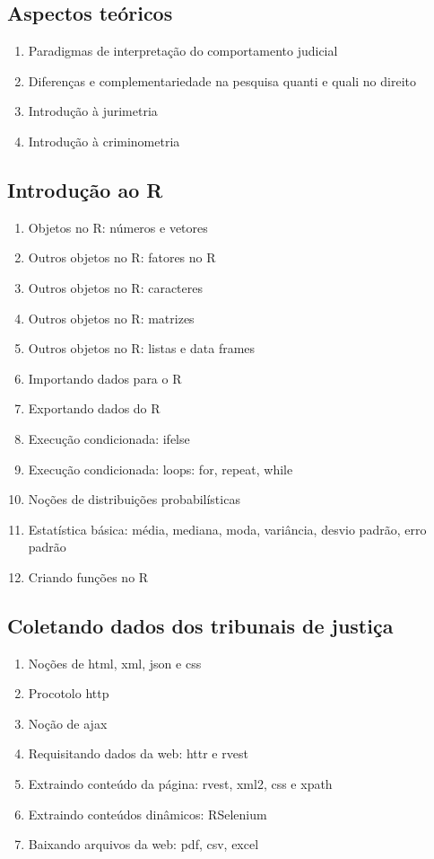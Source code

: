 \documentclass[12pt,]{article}
\providecommand{\tightlist}{%
  \setlength{\itemsep}{0pt}\setlength{\parskip}{0pt}}
\begin{document}
\subsection{Aspectos teóricos}\label{aspectos-teoricos}

\begin{enumerate}
\def\labelenumi{\arabic{enumi}.}
\tightlist
\item
  Paradigmas de interpretação do comportamento judicial
\item
  Diferenças e complementariedade na pesquisa quanti e quali no direito
\item
  Introdução à jurimetria
\item
  Introdução à criminometria
\end{enumerate}

\subsection{Introdução ao R}\label{introducao-ao-r}

\begin{enumerate}
\def\labelenumi{\arabic{enumi}.}
\tightlist
\item
  Objetos no R: números e vetores
\item
  Outros objetos no R: fatores no R
\item
  Outros objetos no R: caracteres
\item
  Outros objetos no R: matrizes
\item
  Outros objetos no R: listas e data frames
\item
  Importando dados para o R
\item
  Exportando dados do R
\item
  Execução condicionada: ifelse
\item
  Execução condicionada: loops: for, repeat, while
\item
  Noções de distribuições probabilísticas
\item
  Estatística básica: média, mediana, moda, variância, desvio padrão,
  erro padrão
\item
  Criando funções no R
\end{enumerate}

\subsection{Coletando dados dos tribunais de
justiça}\label{coletando-dados-dos-tribunais-de-justica}

\begin{enumerate}
\def\labelenumi{\arabic{enumi}.}
\tightlist
\item
  Noções de html, xml, json e css
\item
  Procotolo http
\item
  Noção de ajax
\item
  Requisitando dados da web: httr e rvest
\item
  Extraindo conteúdo da página: rvest, xml2, css e xpath
\item
  Extraindo conteúdos dinâmicos: RSelenium
\item
  Baixando arquivos da web: pdf, csv, excel
\end{enumerate}
\end{document}
